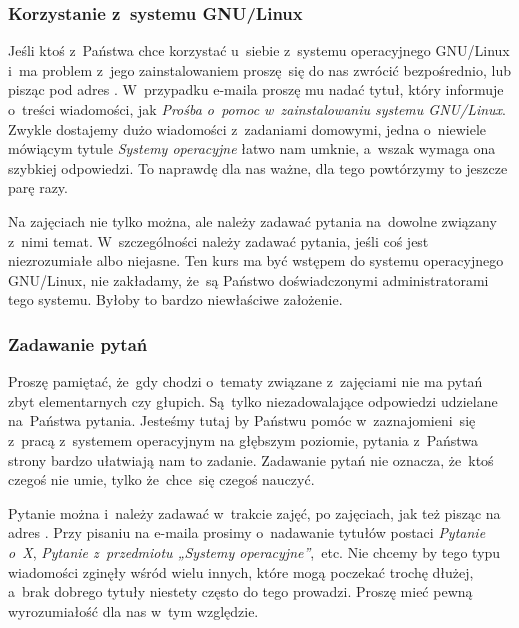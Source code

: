 \documentclass[10pt,t]{beamer}
\begin{document}
\begin{frame}
  \frametitle{Korzystanie z~systemu GNU/Linux}


  Jeśli ktoś z~Państwa chce korzystać u~siebie z~systemu operacyjnego
  GNU/Linux i~ma problem z~jego zainstalowaniem proszę~się do nas zwrócić
  bezpośrednio, lub pisząc pod adres \email. W~przypadku e-maila proszę mu
  nadać tytuł, który informuje o~treści wiadomości, jak
  \textit{Prośba o~pomoc w~zainstalowaniu systemu GNU/Linux}. Zwykle
  dostajemy dużo wiadomości z~zadaniami domowymi, jedna o~niewiele mówiącym
  tytule \textit{Systemy operacyjne} łatwo nam umknie, a~wszak wymaga ona
  szybkiej odpowiedzi. To naprawdę dla nas ważne, dla tego powtórzymy to
  jeszcze parę razy.

  Na zajęciach nie tylko można, ale \alert{należy} zadawać pytania
  na~dowolne związany z~nimi temat. W~szczególności \alert{należy} zadawać
  pytania, jeśli coś jest niezrozumiałe albo niejasne. Ten kurs ma być
  wstępem do systemu operacyjnego GNU/Linux, \alert{nie} zakładamy, że~są
  Państwo doświadczonymi administratorami tego systemu. Byłoby to bardzo
  niewłaściwe założenie.

\end{frame}





\begin{frame}
  \frametitle{Zadawanie pytań}


  Proszę pamiętać, że~gdy chodzi o~tematy związane z~zajęciami \alert{nie}
  ma pytań zbyt elementarnych czy głupich. Są~tylko niezadowalające
  odpowiedzi udzielane na~Państwa pytania. Jesteśmy tutaj by Państwu pomóc
  w~zaznajomieni~się z~pracą z~systemem operacyjnym na głębszym poziomie,
  pytania z~Państwa strony bardzo ułatwiają nam to zadanie. Zadawanie pytań
  nie oznacza, że~ktoś czegoś nie umie, tylko że~chce~się czegoś nauczyć.

  Pytanie można i~\alert{należy} zadawać w~trakcie zajęć, po zajęciach, jak
  też pisząc na adres \email. Przy pisaniu na e-maila prosimy o~nadawanie
  tytułów postaci \textit{Pytanie o~X}, \textit{Pytanie z~przedmiotu
    „Systemy operacyjne”},~etc. Nie chcemy by tego typu wiadomości zginęły
  wśród wielu innych, które mogą poczekać trochę dłużej, a~brak dobrego
  tytuły niestety często do tego prowadzi. Proszę mieć pewną wyrozumiałość
  dla nas w~tym względzie.

\end{frame}
\end{document}
